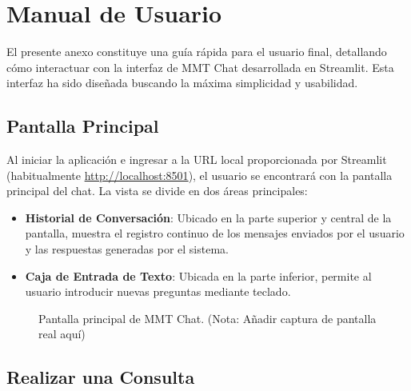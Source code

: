 

\chapter{Manual de Usuario}
\label{anexo:manual_usuario}

El presente anexo constituye una guía rápida para el usuario final, detallando cómo interactuar con la interfaz de MMT Chat desarrollada en Streamlit. Esta interfaz ha sido diseñada buscando la máxima simplicidad y usabilidad.

\section{Pantalla Principal}

Al iniciar la aplicación e ingresar a la URL local proporcionada por Streamlit (habitualmente \url{http://localhost:8501}), el usuario se encontrará con la pantalla principal del chat. La vista se divide en dos áreas principales:

\begin{itemize}
    \item \textbf{Historial de Conversación}: Ubicado en la parte superior y central de la pantalla, muestra el registro continuo de los mensajes enviados por el usuario y las respuestas generadas por el sistema.
    \item \textbf{Caja de Entrada de Texto}: Ubicada en la parte inferior, permite al usuario introducir nuevas preguntas mediante teclado.
\end{itemize}

\begin{figure}[ht]
    \centering
    \vspace{4cm} %
    \caption{Pantalla principal de MMT Chat. (Nota: Añadir captura de pantalla real aquí)}
    \label{fig:interfaz_principal}
\end{figure}

\section{Realizar una Consulta}

